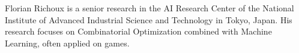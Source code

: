 \documentclass[journal]{IEEEtran}
\begin{document}
\begin{IEEEbiographynophoto}{Florian Richoux}
is a senior research in the AI Research Center of the National
Institute  of Advanced  Industrial  Science and  Technology in  Tokyo,
Japan.  His research  focuses on  Combinatorial Optimization  combined
with Machine Learning, often applied on games.


\end{IEEEbiographynophoto}
\end{document}
